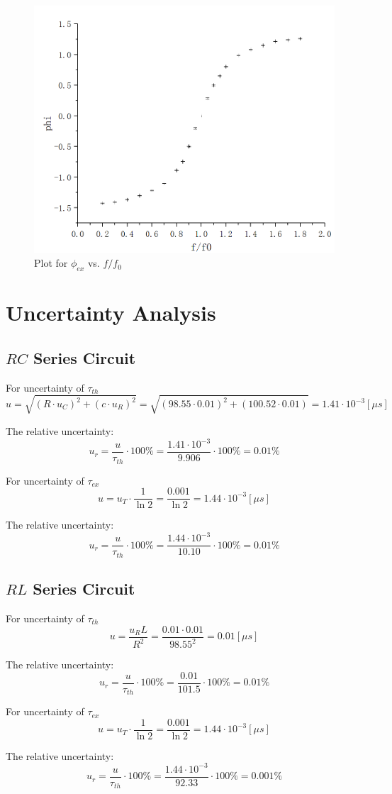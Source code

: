 \documentclass[12pt]{article}
\begin{document}
\begin{figure}[H]
\centering
\includegraphics[scale=0.35]{P11.jpg}
\caption{Plot for $\phi_{ex}$ vs. $f/f_0$}
\end{figure}
\section{Uncertainty Analysis}
\subsection{$RC$ Series Circuit}
For uncertainty of $\tau_{th}$
$$u=\sqrt{(R\cdot u_C)^2+(c\cdot u_R)^2}=\sqrt{(98.55\cdot0.01)^2+(100.52\cdot0.01)}=1.41\cdot10^{-3}[\mu s]$$
\par The relative uncertainty:
$$u_r=\frac{u}{\tau_{th}}\cdot100\%=\frac{1.41\cdot10^{-3}}{9.906}\cdot100\%=0.01\%$$
\par For uncertainty of $\tau_{ex}$
$$u=u_T\cdot\frac{1}{\ln2}=\frac{0.001}{\ln2}=1.44\cdot10^{-3}[\mu s]$$
\par The relative uncertainty:
$$u_r=\frac{u}{\tau_{th}}\cdot100\%=\frac{1.44\cdot10^{-3}}{10.10}\cdot100\%=0.01\%$$
\subsection{$RL$ Series Circuit}
For uncertainty of $\tau_{th}$
$$u=\frac{u_RL}{R^2}=\frac{0.01\cdot0.01}{98.55^2}=0.01[\mu s]$$
\par The relative uncertainty:
$$u_r=\frac{u}{\tau_{th}}\cdot100\%=\frac{0.01}{101.5}\cdot100\%=0.01\%$$
\par For uncertainty of $\tau_{ex}$
$$u=u_T\cdot\frac{1}{\ln2}=\frac{0.001}{\ln2}=1.44\cdot10^{-3}[\mu s]$$
\par The relative uncertainty:
$$u_r=\frac{u}{\tau_{th}}\cdot100\%=\frac{1.44\cdot10^{-3}}{92.33}\cdot100\%=0.001\%$$
\end{document}
